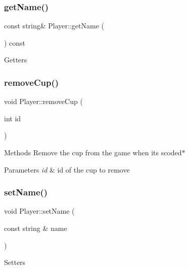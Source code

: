 \subsubsection{\texorpdfstring{get\+Name()}{getName()}}
{\footnotesize\ttfamily const string\& Player\+::get\+Name (\begin{DoxyParamCaption}{ }\end{DoxyParamCaption}) const\hspace{0.3cm}{\ttfamily [inline]}}

Getters \mbox{\label{classPlayer_aa7dba7ff02f3dbd9be8c4a5e4ad4ad29}} 
\subsubsection{\texorpdfstring{remove\+Cup()}{removeCup()}}
{\footnotesize\ttfamily void Player\+::remove\+Cup (\begin{DoxyParamCaption}\item[{int}]{id }\end{DoxyParamCaption})}

Methods Remove the cup from the game when it\textquotesingle{}s scoded$\ast$


\begin{DoxyParams}{Parameters}
{\em id} & id of the cup to remove \\
\hline
\end{DoxyParams}
\mbox{\label{classPlayer_ad2787badc3f3d990842e745a10eb972c}} 
\subsubsection{\texorpdfstring{set\+Name()}{setName()}}
{\footnotesize\ttfamily void Player\+::set\+Name (\begin{DoxyParamCaption}\item[{const string \&}]{name }\end{DoxyParamCaption})\hspace{0.3cm}{\ttfamily [inline]}}

Setters \mbox{\label{classPlayer_a5591923f5d56cf30873ca8aa171c6b3f}} 
